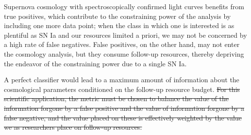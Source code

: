 Supernova cosmology with spectroscopically confirmed light curves benefits from true positives, which contribute to the constraining power of the analysis by including one more data point;
when the class in which one is interested is as plentiful as SN Ia and our resources limited a priori, we may not be concerned by a high rate of false negatives.
False positives, on the other hand, may not enter the cosmology analysis, but they consume follow-up resources, thereby depriving the endeavor of the constraining power due to a single SN Ia.

A perfect classifier would lead to a maximum amount of information about the cosmological parameters conditioned on the follow-up resource budget.
\sout{For this scientific application, the metric must be chosen to balance the value of the information forgone by a false positive and the value of information forgone by a false negative, and the value placed on these is effectively weighted by the value we as researchers place on follow-up resources.}

\label{sec:anom}

